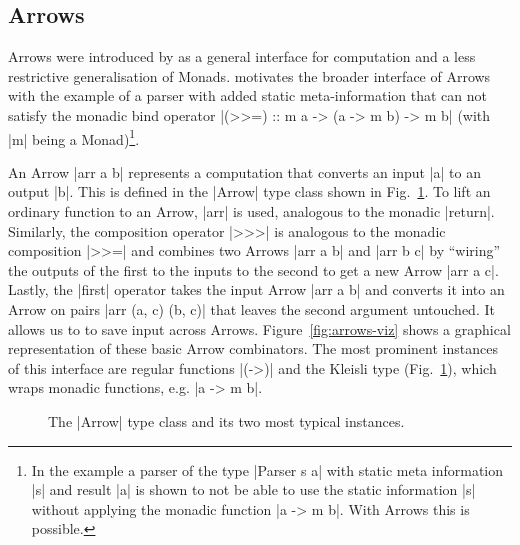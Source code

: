 \subsection{Arrows}
\label{sec:arrows}
Arrows were introduced by \citet{HughesArrows} as a general interface for computation and a less restrictive generalisation of Monads. \citeauthor{HughesArrows} motivates the broader interface of Arrows with the example of a parser with added static meta-information that can not satisfy the monadic bind operator |(>>=) :: m a -> (a -> m b) -> m b| (with |m| being a Monad)\footnote{In the example a parser of the type |Parser s a| with static meta information |s| and result |a| is shown to not be able to use the static information |s| without applying the monadic function |a -> m b|. With Arrows this is possible.}.

An Arrow |arr a b| represents a computation that converts an input |a| to an output |b|. This is defined in the |Arrow| type class shown in Fig.~\ref{fig:ArrowDefinition}.
%
To lift an ordinary function to an Arrow, |arr| is used, analogous to the monadic |return|. Similarly, the composition operator |>>>| is analogous to the monadic composition |>>=| and combines two Arrows |arr a b| and |arr b c| by \enquote{wiring} the outputs of the first to the inputs to the second to get a new Arrow |arr a c|. Lastly, the |first| operator takes the input Arrow |arr a b| and converts it into an Arrow on pairs |arr (a, c) (b, c)| that leaves the second argument untouched. It allows us to to save input across Arrows. Figure~\ref{fig:arrows-viz} shows a graphical representation of these basic Arrow combinators.
The most prominent instances of this interface are regular functions |(->)|
and the Kleisli type (Fig.~\ref{fig:ArrowDefinition}), which wraps monadic functions, e.g.  |a -> m b|.

\begin{figure}[t]
\centering
{}
\vfill
\caption{The |Arrow| type class and its two most typical instances.}
\label{fig:ArrowDefinition}
\end{figure}

